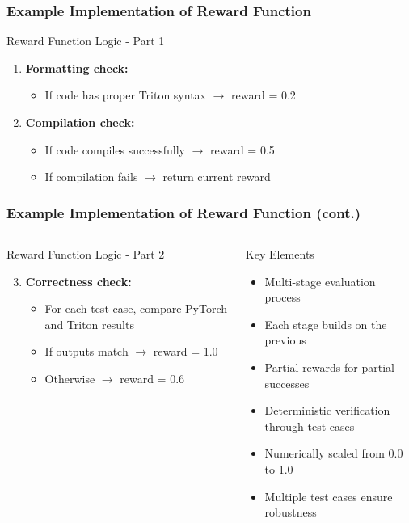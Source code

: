 \documentclass[aspectratio=169]{beamer}
\begin{document}
\begin{frame}
	\frametitle{Example Implementation of Reward Function}
	\begin{block}{Reward Function Logic - Part 1}
		\begin{enumerate}
			\item \textbf{Formatting check:}
			\begin{itemize}
				\item If code has proper Triton syntax $\rightarrow$ reward = 0.2
			\end{itemize}
			\item \textbf{Compilation check:}
			\begin{itemize}
				\item If code compiles successfully $\rightarrow$ reward = 0.5
				\item If compilation fails $\rightarrow$ return current reward
			\end{itemize}
		\end{enumerate}
	\end{block}
\end{frame}

\begin{frame}
	\frametitle{Example Implementation of Reward Function (cont.)}
	\begin{columns}
		\begin{column}{0.48\textwidth}
			\begin{block}{Reward Function Logic - Part 2}
				\begin{enumerate}\setcounter{enumi}{2}
					\item \textbf{Correctness check:}
					\begin{itemize}
						\item For each test case, compare PyTorch and Triton results
						\item If outputs match $\rightarrow$ reward = 1.0
						\item Otherwise $\rightarrow$ reward = 0.6
					\end{itemize}
				\end{enumerate}
			\end{block}
		\end{column}
		\begin{column}{0.48\textwidth}
			\begin{block}{Key Elements}
				\begin{itemize}
					\item Multi-stage evaluation process
					\item Each stage builds on the previous
					\item Partial rewards for partial successes
					\item Deterministic verification through test cases
					\item Numerically scaled from 0.0 to 1.0
					\item Multiple test cases ensure robustness
				\end{itemize}
			\end{block}
		\end{column}
	\end{columns}
\end{frame}
\end{document}
